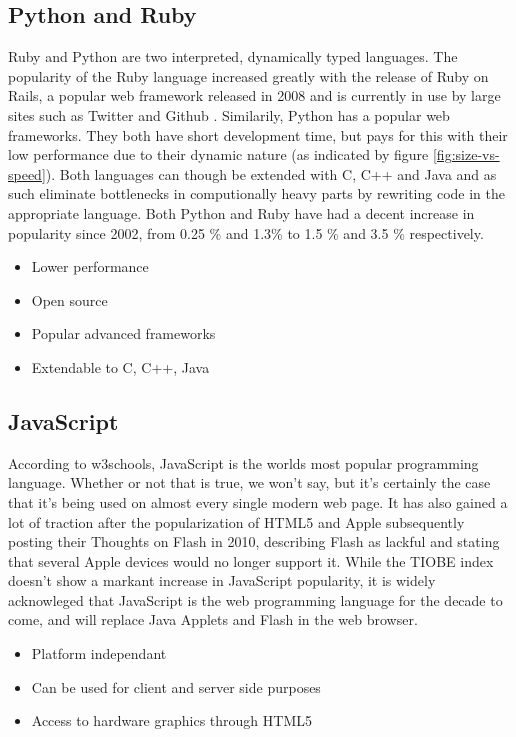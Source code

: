 \documentclass{report}
\begin{document}
\subsection{Python and Ruby}
Ruby and Python are two interpreted, dynamically typed languages. The popularity of the Ruby language increased greatly with the release of Ruby on Rails, a popular web framework released in 2008 and is currently in use by large sites such as Twitter and Github \cite{website:ruby_on_rails}. Similarily, Python has a popular web frameworks\cite{website:python_frameworks}. They both have short development time, but pays for this with their low performance due to their dynamic nature (as indicated by figure \ref{fig:size-vs-speed}). Both languages can though be extended with C, C++ and Java and as such eliminate bottlenecks in computionally heavy parts by rewriting code in the appropriate language. Both Python and Ruby have had a decent increase in popularity since 2002, from 0.25 \%  and 1.3\% to 1.5 \%  and 3.5 \% respectively.
\begin{itemize}
\item Lower performance
\item Open source
\item Popular advanced frameworks
\item Extendable to C, C++, Java
\end{itemize}

\subsection{JavaScript}
According to w3schools\cite{website:w3schools_js}, JavaScript is the worlds most popular programming language. Whether or not that is true, we won't say, but it's certainly the case that it's being used on almost every single modern web page. It has also gained a lot of traction after the popularization of HTML5 and Apple subsequently posting their Thoughts on Flash\cite{website:thoughts_on_flash} in 2010, describing Flash as lackful and stating that several Apple devices would no longer support it. While the TIOBE index doesn't show a markant increase in JavaScript popularity, it is widely acknowleged that JavaScript is the web programming language for the decade to come, and will replace Java Applets and Flash in the web browser\cite{website:js_wins1}\cite{website:js_wins2}\cite{website:js_wins3}\cite{website:js_wins4}.
\begin{itemize}
\item Platform independant
\item Can be used for client and server side purposes
\item Access to hardware graphics through HTML5
\end{itemize}
\end{document}
